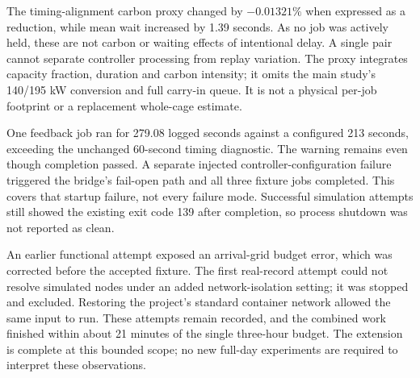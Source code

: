 The timing-alignment carbon proxy changed by $-0.01321\%$ when expressed as a reduction, while mean wait increased by 1.39 seconds. As no job was actively held, these are not carbon or waiting effects of intentional delay. A single pair cannot separate controller processing from replay variation. The proxy integrates capacity fraction, duration and carbon intensity; it omits the main study's 140/195 kW conversion and full carry-in queue. It is not a physical per-job footprint or a replacement whole-cage estimate.

One feedback job ran for 279.08 logged seconds against a configured 213 seconds, exceeding the unchanged 60-second timing diagnostic. The warning remains even though completion passed. A separate injected controller-configuration failure triggered the bridge's fail-open path and all three fixture jobs completed. This covers that startup failure, not every failure mode. Successful simulation attempts still showed the existing exit code 139 after completion, so process shutdown was not reported as clean.

An earlier functional attempt exposed an arrival-grid budget error, which was corrected before the accepted fixture. The first real-record attempt could not resolve simulated nodes under an added network-isolation setting; it was stopped and excluded. Restoring the project's standard container network allowed the same input to run. These attempts remain recorded, and the combined work finished within about 21 minutes of the single three-hour budget. The extension is complete at this bounded scope; no new full-day experiments are required to interpret these observations.
